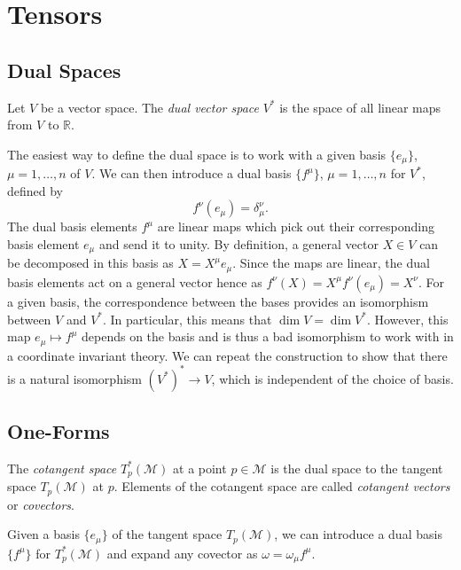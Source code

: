 
\section{Tensors}%
\label{sec:tensors}

\subsection*{Dual Spaces}%

\begin{definition}
  Let $V$ be a vector space. The \emph{dual vector space} $V^*$ is the space of all linear maps from $V$ to $\mathbb{R}$.
\end{definition}

The easiest way to define the dual space is to work with a given basis $\{e_\mu\}$, $\mu = 1, \dots, n$ of $V$.
We can then introduce a dual basis $\{f^\mu\}$, $\mu = 1, \dots, n$ for $V^*$, defined by
\begin{equation}
  f^\nu (e_\mu) = \delta^\nu_\mu.
\end{equation}
The dual basis elements $f^\mu$ are linear maps which pick out their corresponding basis element $e_\mu$ and send it to unity. 
By definition, a general vector $X \in V$ can be decomposed in this basis as $X = X^\mu e_\mu$.
Since the maps are linear, the dual basis elements act on a general vector hence as $f^\nu(X) = X^\mu f^\nu (e_\mu) = X^\nu$.
For a given basis, the correspondence between the bases provides an isomorphism between $V$ and $V^*$. In particular, this means that $\dim V = \dim V^*$. However, this map $e_\mu \mapsto f^\mu$ depends on the basis and is thus a bad isomorphism to work with in a coordinate invariant theory.
We can repeat the construction to show that there is a natural isomorphism $(V^*)^* \to V$, which is independent of the choice of basis.

\subsection{One-Forms}%
\label{sub:one_forms}

\begin{definition}
  The \emph{cotangent space} $T_p^*(\mathcal{M})$ at a point $p \in \mathcal{M}$ is the dual space to the tangent space $T_p(\mathcal{M})$ at $p$. Elements of the cotangent space are called \emph{cotangent vectors} or \emph{covectors}.
\end{definition}
Given a basis $\{ e_\mu \}$ of the tangent space $T_p(\mathcal{M})$, we can introduce a dual basis $\{f^\mu\}$ for $T_p^*(\mathcal{M})$ and expand any covector as $\omega = \omega_\mu f^\mu$.

